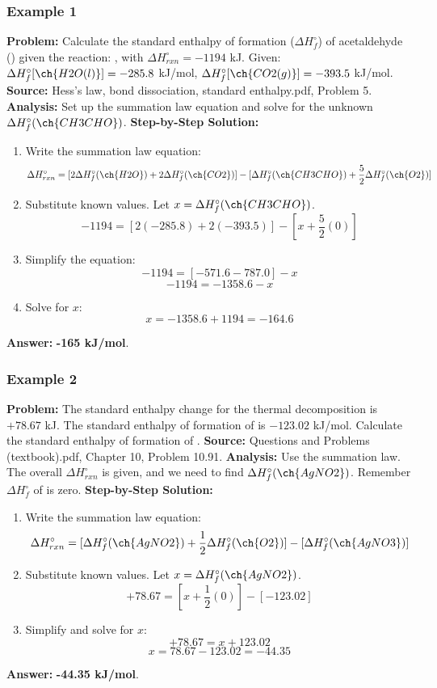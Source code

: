 \documentclass{article}
\begin{document}
\subsubsection{Example 1}
\textbf{Problem:} Calculate the standard enthalpy of formation ($\Delta H_f^\circ$) of acetaldehyde () given the reaction: , with $\Delta H_{rxn}^\circ = -1194$ kJ.
Given: $\Delta H_f^\circ[\ch{H2O(l)}] = -285.8$ kJ/mol, $\Delta H_f^\circ[\ch{CO2(g)}] = -393.5$ kJ/mol.
\textbf{Source:} Hess's law, bond dissociation, standard enthalpy.pdf, Problem 5.
\textbf{Analysis:} Set up the summation law equation and solve for the unknown $\Delta H_f^\circ(\ch{CH3CHO})$.
\textbf{Step-by-Step Solution:}
\begin{enumerate}
    \item Write the summation law equation:
    \[ \Delta H_{rxn}^\circ = [2\Delta H_f^\circ(\ch{H2O}) + 2\Delta H_f^\circ(\ch{CO2})] - [\Delta H_f^\circ(\ch{CH3CHO}) + \frac{5}{2}\Delta H_f^\circ(\ch{O2})] \]
    \item Substitute known values. Let $x = \Delta H_f^\circ(\ch{CH3CHO})$.
    \[ -1194 = [2(-285.8) + 2(-393.5)] - [x + \frac{5}{2}(0)] \]
    \item Simplify the equation:
    \[ -1194 = [-571.6 - 787.0] - x \]
    \[ -1194 = -1358.6 - x \]
    \item Solve for $x$:
    \[ x = -1358.6 + 1194 = -164.6 \]
\end{enumerate}
\textbf{Answer:} \textbf{-165 kJ/mol}.

\subsubsection{Example 2}
\textbf{Problem:} The standard enthalpy change for the thermal decomposition  is $+78.67$ kJ. The standard enthalpy of formation of  is $-123.02$ kJ/mol. Calculate the standard enthalpy of formation of .
\textbf{Source:} Questions and Problems (textbook).pdf, Chapter 10, Problem 10.91.
\textbf{Analysis:} Use the summation law. The overall $\Delta H_{rxn}^\circ$ is given, and we need to find $\Delta H_f^\circ(\ch{AgNO2})$. Remember $\Delta H_f^\circ$ of  is zero.
\textbf{Step-by-Step Solution:}
\begin{enumerate}
    \item Write the summation law equation:
    \[ \Delta H_{rxn}^\circ = [\Delta H_f^\circ(\ch{AgNO2}) + \frac{1}{2}\Delta H_f^\circ(\ch{O2})] - [\Delta H_f^\circ(\ch{AgNO3})] \]
    \item Substitute known values. Let $x = \Delta H_f^\circ(\ch{AgNO2})$.
    \[ +78.67 = [x + \frac{1}{2}(0)] - [-123.02] \]
    \item Simplify and solve for $x$:
    \[ +78.67 = x + 123.02 \]
    \[ x = 78.67 - 123.02 = -44.35 \]
\end{enumerate}
\textbf{Answer:} \textbf{-44.35 kJ/mol}.
\end{document}
